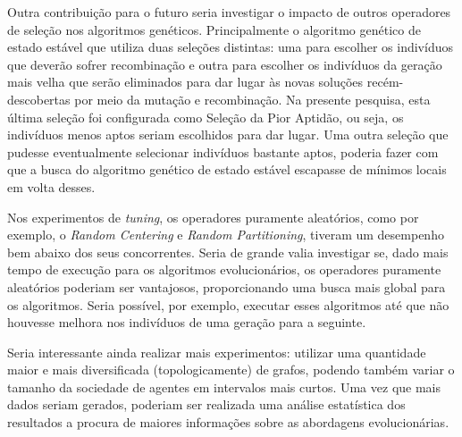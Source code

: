 Outra contribuição para o futuro seria investigar o impacto de outros operadores 
de seleção nos algoritmos genéticos. Principalmente o algoritmo genético de 
estado estável que utiliza duas seleções distintas: uma para escolher os 
indivíduos que deverão sofrer recombinação e outra para escolher os indivíduos 
da geração mais velha que serão eliminados para dar lugar às novas soluções 
recém-descobertas por meio da mutação e recombinação. Na presente pesquisa, 
esta última seleção foi configurada como Seleção da Pior Aptidão, ou seja, os 
indivíduos menos aptos seriam escolhidos para dar lugar. Uma outra seleção 
que pudesse eventualmente selecionar indivíduos bastante aptos, poderia fazer 
com que a busca do algoritmo genético de estado estável escapasse de mínimos 
locais em volta desses.

Nos experimentos de \textit{tuning}, os operadores puramente aleatórios, como 
por exemplo, o \textit{Random Centering} e \textit{Random Partitioning}, tiveram 
um desempenho bem abaixo dos seus concorrentes. Seria de grande valia investigar 
se, dado mais tempo de execução para os algoritmos evolucionários, os operadores 
puramente aleatórios poderiam ser vantajosos, proporcionando uma busca mais 
global para os algoritmos. Seria possível, por exemplo, executar esses 
algoritmos até que não houvesse melhora nos indivíduos de uma geração para a 
seguinte.

Seria interessante ainda realizar mais experimentos: utilizar uma quantidade 
maior e mais diversificada (topologicamente) de grafos, podendo também variar 
o tamanho da sociedade de agentes em intervalos mais curtos. Uma vez que mais 
dados seriam gerados, poderiam ser realizada uma análise estatística dos 
resultados a procura de maiores informações sobre as abordagens evolucionárias.